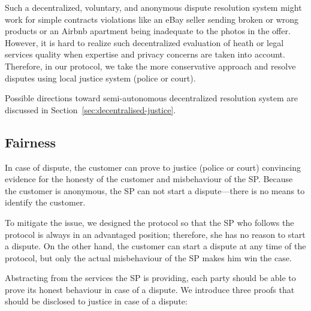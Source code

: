 \documentclass{ieeeaccess}
\begin{document}
Such a decentralized, voluntary, and anonymous dispute resolution system might work for simple contracts violations like an eBay seller sending broken or wrong products or an Airbnb apartment being inadequate to the photos in the offer. However, it is hard to realize such decentralized evaluation of heath or legal services quality when expertise and privacy concerns are taken into account. Therefore, in our protocol, we take the more conservative approach and resolve disputes using local
justice system (police or court).

Possible directions toward semi-autonomous decentralized resolution system are discussed in Section~\ref{sec:decentralised-justice}.

\subsection{Fairness}\label{fairness}

In case of dispute, the customer can prove to justice (police or court) convincing evidence for the honesty of the customer and misbehaviour of the SP. 
Because the customer is anonymous, the SP can not start a dispute---there is no means to identify the customer.

To mitigate the issue, we designed the protocol so that the SP who follows the protocol is always in an advantaged position; therefore, she has no reason to start a dispute. On the other hand, the customer can start a dispute at any time of the protocol, but only the actual misbehaviour of the SP makes him win the case.

Abstracting from the services the SP is providing, each party should be able to prove its honest behaviour in case of a dispute. We introduce three proofs that should be disclosed to justice in case of a dispute:
\end{document}
